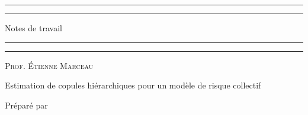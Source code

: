 \documentclass{article}
\begin{document}
	
		\begin{titlepage}
		\centering %
		
		\scshape %
		
		\vspace*{3\baselineskip} %
		
		
		\rule{\textwidth}{1.6pt}\vspace*{-\baselineskip}\vspace*{2pt} %
		\rule{\textwidth}{0.4pt} %
		
		\vspace{0.75\baselineskip} %
		
		{\LARGE Notes de travail \\} %
		\vspace{0.75\baselineskip} %
		
		\rule{\textwidth}{0.4pt}\vspace*{-\baselineskip}\vspace{3.2pt} %
		\rule{\textwidth}{1.6pt} %
		
		\vspace{2\baselineskip} %
		
		{\scshape\Large Prof. Étienne Marceau\\} %
		
		\vspace*{3\baselineskip}
		
		Estimation de copules hiérarchiques pour un modèle de risque collectif \\%
		
		\vspace*{3\baselineskip} %
		
		
		Préparé par
		
		\vspace{0.5\baselineskip} %
		

\end{titlepage}
\end{document}
